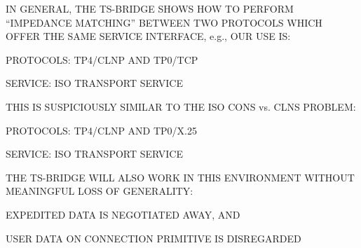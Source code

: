 \begin{bwslide}

\begin{nrtc}
\item	IN GENERAL, THE TS-BRIDGE SHOWS HOW TO PERFORM
	``IMPEDANCE MATCHING'' BETWEEN TWO PROTOCOLS WHICH OFFER THE
	SAME SERVICE INTERFACE, e.g., OUR USE IS:
    \begin{nrtc}
    \item	PROTOCOLS: TP4/CLNP AND TP0/TCP

    \item	SERVICE: ISO TRANSPORT SERVICE
    \end{nrtc}

\item	THIS IS SUSPICIOUSLY SIMILAR TO THE ISO CONS vs. CLNS PROBLEM:
    \begin{nrtc}
    \item	PROTOCOLS: TP4/CLNP AND TP0/X.25

    \item	SERVICE: ISO TRANSPORT SERVICE
    \end{nrtc}

\item	THE TS-BRIDGE WILL ALSO WORK IN THIS ENVIRONMENT WITHOUT
	MEANINGFUL LOSS OF GENERALITY:
    \begin{nrtc}
    \item	EXPEDITED DATA IS NEGOTIATED AWAY, AND

    \item	USER DATA ON CONNECTION PRIMITIVE IS DISREGARDED
    \end{nrtc}
\end{nrtc}
\end{bwslide}



